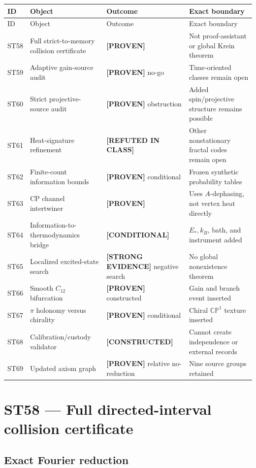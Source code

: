 \documentclass[11pt,a4paper]{article}
\newcommand{\proven}{\textcolor{green!40!black}{\textbf{[PROVEN]}}}
\newcommand{\strong}{\textcolor{blue!70!black}{\textbf{[STRONG EVIDENCE]}}}
\newcommand{\conditional}{\textcolor{black!60}{\textbf{[CONDITIONAL]}}}
\newcommand{\constructed}{\textcolor{violet!70!black}{\textbf{[CONSTRUCTED]}}}
\newcommand{\failed}{\textcolor{red!72!black}{\textbf{[REFUTED IN CLASS]}}}
\begin{document}
\small
\begin{longtable}{@{}p{}p{}p{}p{}@{}}
\toprule
ID & Object & Outcome & Exact boundary\\
\midrule
\endfirsthead
\toprule
ID & Object & Outcome & Exact boundary\\
\midrule
\endhead
ST58 & Full strict-to-memory collision certificate & \proven{} & Not proof-assistant or global Krein theorem\\
ST59 & Adaptive gain-source audit & \proven{} no-go & Time-oriented classes remain open\\
ST60 & Strict projective-source audit & \proven{} obstruction & Added spin/projective structure remains possible\\
ST61 & Heat-signature refinement & \failed{} & Other nonstationary fractal codes remain open\\
ST62 & Finite-count information bounds & \proven{} conditional & Frozen synthetic probability tables\\
ST63 & CP channel intertwiner & \proven{} & Uses $A$-dephasing, not vertex heat directly\\
ST64 & Information-to-thermodynamics bridge & \conditional{} & $E_*,k_B$, bath, and instrument added\\
ST65 & Localized excited-state search & \strong{} negative search & No global nonexistence theorem\\
ST66 & Smooth $C_{12}$ bifurcation & \proven{} constructed & Gain and branch event inserted\\
ST67 & $\pi$ holonomy versus chirality & \proven{} conditional & Chiral $\mathbb{CP}^1$ texture inserted\\
ST68 & Calibration/custody validator & \constructed{} & Cannot create independence or external records\\
ST69 & Updated axiom graph & \proven{} relative no-reduction & Nine source groups retained\\
\bottomrule
\end{longtable}
\normalsize

\section{ST58 --- Full directed-interval collision certificate}

\subsection{Exact Fourier reduction}
\end{document}
